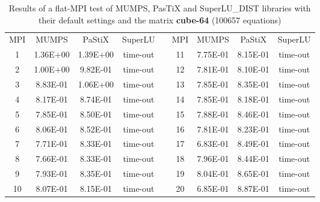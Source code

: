 \begin{table}[ht]
\centering
\begin{tabular}{|c|c|c|c|l|c|c|c|c|}
\cline{1-4} \cline{6-9}
MPI & MUMPS    & PaStiX   & SuperLU  &  & MPI & MUMPS    & PaStiX   & SuperLU  \\ \cline{1-4} \cline{6-9} 
1   & 1.36E+00 & 1.39E+00 & time-out &  & 11  & 7.75E-01 & 8.15E-01 & time-out \\ \cline{1-4} \cline{6-9} 
2   & 1.00E+00 & 9.82E-01 & time-out &  & 12  & 7.81E-01 & 8.10E-01 & time-out \\ \cline{1-4} \cline{6-9} 
3   & 8.83E-01 & 1.06E+00 & time-out &  & 13  & 7.85E-01 & 8.35E-01 & time-out \\ \cline{1-4} \cline{6-9} 
4   & 8.17E-01 & 8.74E-01 & time-out &  & 14  & 7.85E-01 & 8.18E-01 & time-out \\ \cline{1-4} \cline{6-9} 
5   & 7.85E-01 & 8.50E-01 & time-out &  & 15  & 7.88E-01 & 8.46E-01 & time-out \\ \cline{1-4} \cline{6-9} 
6   & 8.06E-01 & 8.52E-01 & time-out &  & 16  & 7.81E-01 & 8.23E-01 & time-out \\ \cline{1-4} \cline{6-9} 
7   & 7.71E-01 & 8.33E-01 & time-out &  & 17  & 6.83E-01 & 8.49E-01 & time-out \\ \cline{1-4} \cline{6-9} 
8   & 7.66E-01 & 8.33E-01 & time-out &  & 18  & 7.96E-01 & 8.44E-01 & time-out \\ \cline{1-4} \cline{6-9} 
9   & 7.93E-01 & 8.35E-01 & time-out &  & 19  & 8.04E-01 & 8.65E-01 & time-out \\ \cline{1-4} \cline{6-9} 
10  & 8.07E-01 & 8.15E-01 & time-out &  & 20  & 6.85E-01 & 8.87E-01 & time-out \\ \cline{1-4} \cline{6-9} 
\end{tabular}
\caption{Results of a flat-MPI test of MUMPS, PasTiX and SuperLU\_DIST libraries with their default settings and the matrix \textbf{cube-64} (100657 equations)}
\label{table:lc-cube-64-result}
\end{table}



